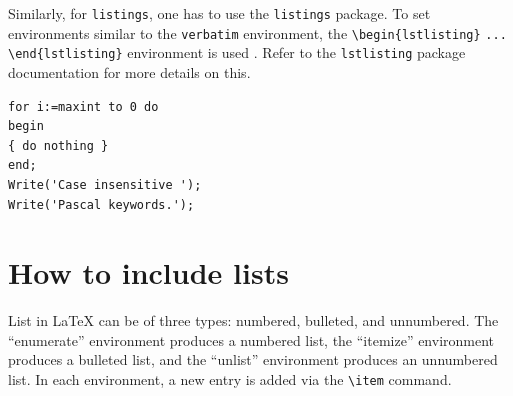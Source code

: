 \documentclass[12pt,a4paper]{article}
\begin{document}
Similarly, for \verb+listings+, one has to use the \verb+listings+ package. To set environments similar to the \verb+verbatim+ environment, the \verb+\begin{lstlisting}+ \verb+... + \verb+\end{lstlisting}+ environment is used . Refer to the \verb+lstlisting+ package documentation for more details on this.

\begin{minipage}{\hsize}%
\lstset{language=Pascal}%
\begin{lstlisting}[frame=single,framexleftmargin=-1pt,framexrightmargin=-17pt,framesep=12pt,linewidth=0.95\textwidth]
for i:=maxint to 0 do
begin
{ do nothing }
end;
Write('Case insensitive ');
Write('Pascal keywords.');
\end{lstlisting}
\end{minipage}


\section{How to include lists}\label{sec7}

List in \LaTeX{} can be of three types: numbered, bulleted, and unnumbered. The ``enumerate'' environment produces a numbered list, the 
``itemize'' environment produces a bulleted list, and the ``unlist''
environment produces an unnumbered list.
In each environment, a new entry is added via the \verb+\item+ command.
\end{document}
